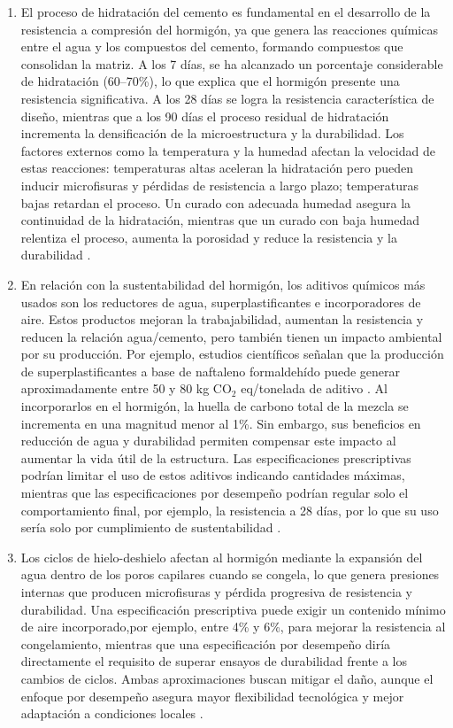 \begin{enumerate}
    \item El proceso de hidratación del cemento es fundamental en el desarrollo de la resistencia a compresión del hormigón, ya que genera las reacciones químicas entre el agua y los compuestos del cemento, formando compuestos que consolidan la matriz. A los 7 días, se ha alcanzado un porcentaje considerable de hidratación (60–70\%), lo que explica que el hormigón presente una resistencia significativa. A los 28 días se logra la resistencia característica de diseño, mientras que a los 90 días el proceso residual de hidratación incrementa la densificación de la microestructura y la durabilidad. Los factores externos como la temperatura y la humedad afectan la velocidad de estas reacciones: temperaturas altas aceleran la hidratación pero pueden inducir microfisuras y pérdidas de resistencia a largo plazo; temperaturas bajas retardan el proceso. Un curado con adecuada humedad asegura la continuidad de la hidratación, mientras que un curado con baja humedad relentiza el proceso, aumenta la porosidad y reduce la resistencia y la durabilidad \citep{NCh170-2016}.

    \item En relación con la sustentabilidad del hormigón, los aditivos químicos más usados son los reductores de agua, superplastificantes e incorporadores de aire. Estos productos mejoran la trabajabilidad, aumentan la resistencia y reducen la relación agua/cemento, pero también tienen un impacto ambiental por su producción. Por ejemplo, estudios científicos señalan que la producción de superplastificantes a base de naftaleno formaldehído puede generar aproximadamente entre 50 y 80 kg CO$_2$ eq/tonelada de aditivo \citep{Habert2011,Flower2007}. Al incorporarlos en el hormigón, la huella de carbono total de la mezcla se incrementa en una magnitud menor al 1\%. Sin embargo, sus beneficios en reducción de agua y durabilidad permiten compensar este impacto al aumentar la vida útil de la estructura. Las especificaciones prescriptivas podrían limitar el uso de estos aditivos indicando cantidades máximas, mientras que las especificaciones por desempeño podrían regular solo el comportamiento final, por ejemplo, la resistencia a 28 días, por lo que su uso sería solo por cumplimiento de sustentabilidad \citep{NCh170-2016}.

    \item Los ciclos de hielo-deshielo afectan al hormigón mediante la expansión del agua dentro de los poros capilares cuando se congela, lo que genera presiones internas que producen microfisuras y pérdida progresiva de resistencia y durabilidad. Una especificación prescriptiva puede exigir un contenido mínimo de aire incorporado,por ejemplo, entre 4\% y 6\%, para mejorar la resistencia al congelamiento, mientras que una especificación por desempeño diría directamente el requisito de superar ensayos de durabilidad frente a los cambios de ciclos. Ambas aproximaciones buscan mitigar el daño, aunque el enfoque por desempeño asegura mayor flexibilidad tecnológica y mejor adaptación a condiciones locales \citep{Powers1954,MehtaMonteiro2014}.


\end{enumerate}
